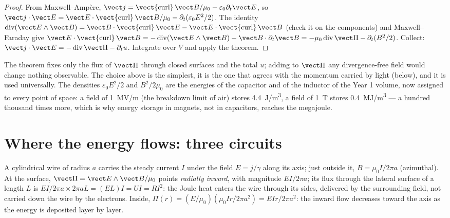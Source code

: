 \begin{proof}
From Maxwell--Ampère, $\vect j = \operatorname{\vect{curl}}\vect B/\mu_0 - \varepsilon_0\partial_t
\vect E$, so $\vect j\cdot\vect E = \vect E\cdot\operatorname{\vect{curl}}\vect B/\mu_0 -
\partial_t(\varepsilon_0E^2/2)$. The identity $\operatorname{div}(\vect E\wedge\vect B) = \vect B
\cdot\operatorname{\vect{curl}}\vect E - \vect E\cdot\operatorname{\vect{curl}}\vect B$ (check it
on the components) and Maxwell--Faraday give $\vect E\cdot\operatorname{\vect{curl}}
\vect B = -\operatorname{div}(\vect E\wedge\vect B) - \vect B\cdot\partial_t\vect B = -\mu_0
\operatorname{div}\vect\Pi - \partial_t(B^2/2)$. Collect: $\vect j\cdot\vect E = -\operatorname{div}
\vect\Pi - \partial_tu$. Integrate over $V$ and apply the  theorem.
\end{proof}

\begin{remark}\label{rem:b2:poynting-vector:interpretation}
The theorem fixes only the flux of $\vect\Pi$ through closed surfaces
and the total $u$; adding to $\vect\Pi$ any divergence-free field would
change nothing observable. The choice above is the simplest, it is the
one that agrees with the momentum carried by light (below), and it is
used universally. The densities $\varepsilon_0E^2/2$ and $B^2/2\mu_0$ are the
energies of the capacitor and of the inductor of the Year 1 volume,
now assigned to every point of space: a field of \qty{1}{MV/m} (the
breakdown limit of air) stores \qty{4.4}{J/m^3}, a field of \qty{1}{T}
stores \qty{0.4}{MJ/m^3} --- a hundred thousand times more, which is why
energy storage in magnets, not in capacitors, reaches the megajoule.
\end{remark}

\section{Where the energy flows: three circuits}

\begin{example}\label{ex:b2:poynting-vector:wire}
A cylindrical wire of radius $a$ carries the steady current $I$ under the
field $E = j/\gamma$ along its axis; just outside it, $B = \mu_0I/2\pi a$
(azimuthal). At the surface, $\vect\Pi = \vect E\wedge\vect B/\mu_0$ points
\emph{radially inward}, with magnitude $EI/2\pi a$; its flux through the
lateral surface of a length $L$ is $EI/2\pi a\times2\pi aL = (EL)I = UI =
RI^2$: the Joule heat enters the wire through its sides, delivered by
the surrounding field, not carried down the wire by the electrons.
Inside, $\Pi(r) = (E/\mu_0)(\mu_0Ir/2\pi a^2) = EIr/2\pi a^2$: the inward flow
decreases toward the axis as the energy is deposited layer by layer.
\end{example}

